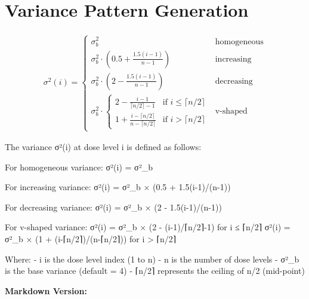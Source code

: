 \documentclass[
]{article}
\begin{document}
\hypertarget{variance-pattern-generation}{%
\section{Variance Pattern
Generation}\label{variance-pattern-generation}}

\begin{align*}
\sigma^2(i) = \begin{cases}
\sigma^2_b & \text{homogeneous} \\[2ex]
\sigma^2_b \cdot \left(0.5 + \frac{1.5(i-1)}{n-1}\right) & \text{increasing} \\[2ex]
\sigma^2_b \cdot \left(2 - \frac{1.5(i-1)}{n-1}\right) & \text{decreasing} \\[2ex]
\sigma^2_b \cdot \begin{cases}
2 - \frac{i-1}{\lceil n/2 \rceil-1} & \text{if } i \leq \lceil n/2 \rceil \\[1ex]
1 + \frac{i-\lceil n/2 \rceil}{n-\lceil n/2 \rceil} & \text{if } i > \lceil n/2 \rceil
\end{cases} & \text{v-shaped}
\end{cases}
\end{align*}

The variance σ²(i) at dose level i is defined as follows:

For homogeneous variance: σ²(i) = σ²\_b

For increasing variance: σ²(i) = σ²\_b × (0.5 + 1.5(i-1)/(n-1))

For decreasing variance: σ²(i) = σ²\_b × (2 - 1.5(i-1)/(n-1))

For v-shaped variance: σ²(i) = σ²\_b × (2 - (i-1)/⌈n/2⌉-1) for i ≤ ⌈n/2⌉
σ²(i) = σ²\_b × (1 + (i-⌈n/2⌉)/(n-⌈n/2⌉)) for i \textgreater{} ⌈n/2⌉

Where: - i is the dose level index (1 to n) - n is the number of dose
levels - σ²\_b is the base variance (default = 4) - ⌈n/2⌉ represents the
ceiling of n/2 (mid-point)

\textbf{Markdown Version:}
\end{document}
